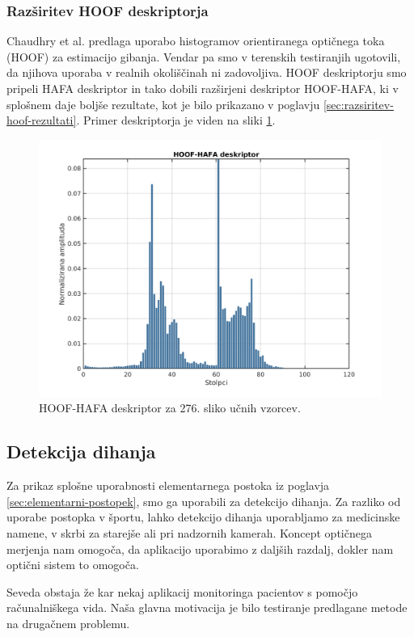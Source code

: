 \subsubsection{Razširitev HOOF deskriptorja}
Chaudhry et al. \cite{chaudhry2009histograms} predlaga uporabo histogramov orientiranega optičnega toka (HOOF) za estimacijo gibanja. Vendar pa smo v terenskih testiranjih ugotovili, da njihova uporaba v realnih okoliščinah ni zadovoljiva. HOOF deskriptorju smo pripeli HAFA deskriptor in tako dobili razširjeni deskriptor HOOF-HAFA, ki v splošnem daje boljše rezultate, kot je bilo prikazano v poglavju \ref{sec:razsiritev-hoof-rezultati}. Primer deskriptorja je viden na sliki \ref{fig:hoof-hafa}.

\begin{figure}[!htb]
	\centering
	\includegraphics[width=0.6\columnwidth]{./Slike/hoof-hafa-squash-276.png}
	\caption{HOOF-HAFA deskriptor za 276. sliko učnih vzorcev.}
	\label{fig:hoof-hafa}
\end{figure}
















\subsection{Detekcija dihanja}
Za prikaz splošne uporabnosti elementarnega postoka iz poglavja \ref{sec:elementarni-postopek}, smo ga uporabili za detekcijo dihanja. Za razliko od uporabe postopka v športu, lahko detekcijo dihanja uporabljamo za medicinske namene, v skrbi za starejše ali pri nadzornih kamerah. Koncept optičnega merjenja nam omogoča, da aplikacijo uporabimo z daljših razdalj, dokler nam optični sistem to omogoča. 

Seveda obstaja že kar nekaj aplikacij monitoringa pacientov s pomočjo računalniškega vida. Naša glavna motivacija je bilo testiranje predlagane metode na drugačnem problemu.


